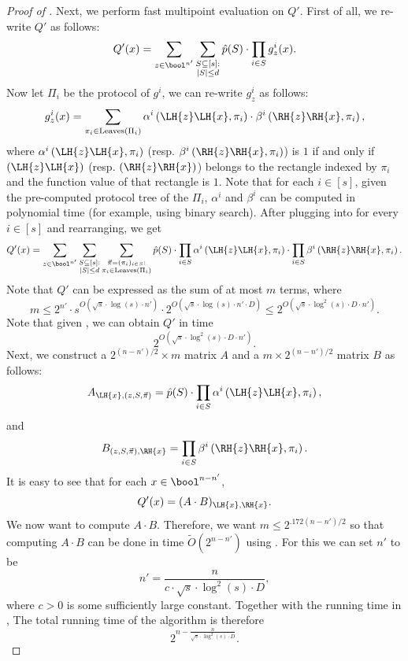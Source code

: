 \begin{proof}[Proof of ]
		Next, we perform fast multipoint evaluation on $Q'$. First of all, we re-write $Q'$ as follows:
		\begin{equation}\label{eq:sat-2}
			Q'(x) = \sum_{z\in\bool^{n'}} \sum_{\substack{S\subseteq[s]: \\ |S|\leq d}}\hat{p}(S)\cdot\prod_{i\in S}g^i_z(x).
		\end{equation}
		Now let $\Pi_i$ be the protocol of $g^i$, we can re-write $g^i_z$ as follows:
		\begin{equation}\label{eq:sat-3}
		    g^i_z(x)=\sum_{\pi_i\in\mathrm{Leaves}(\Pi_i)} \alpha^i\left(\LH{z}\LH{x},\pi_i\right)\cdot \beta^{i}\left(\RH{z}\RH{x},\pi_i\right),
		\end{equation}
		where $\alpha^i\left(\LH{z}\LH{x},\pi_i\right)$ (resp. $\beta^{i}\left(\RH{z}\RH{x},\pi_i\right)$) is $1$ if and only if $\left(\LH{z}\LH{x}\right)$ (resp. $\left(\RH{z}\RH{x}\right)$) belongs to the rectangle indexed by $\pi_i$ and the function value of that rectangle is $1$. Note that for each $i\in[s]$, given the pre-computed protocol tree of the $\Pi_i$, $\alpha^{i}$ and $\beta^{i}$ can be computed in polynomial time (for example, using binary search).
		After plugging  into  for every $i\in[s]$ and rearranging, we get
		\begin{equation}\label{eq:sat-4}
		    Q'(x) = \sum_{z\in\bool^{n'}} \sum_{\substack{S\subseteq[s]: \\ |S|\leq d}} \sum_{\substack{\vec{\pi}=(\pi_i)_{i\in S}: \\ \pi_i\in\mathrm{Leaves}(\Pi_i)}} \hat{p}(S)\cdot \prod_{i\in S} \alpha^i\left(\LH{z}\LH{x},\pi_i\right)\cdot \prod_{i\in S} \beta^{i}\left(\RH{z}\RH{x},\pi_i\right).
		\end{equation}
		Note that $Q'$ can be expressed as the sum of at most $m$ terms, where
		\[
			m\leq 2^{n'}\cdot s^{O(\sqrt{s}\cdot \log(s)\cdot n')}\cdot 2^{O(\sqrt{s}\cdot \log(s)\cdot n'\cdot D)}\leq 2^{O(\sqrt{s}\cdot\log^2(s)\cdot D\cdot n')}.
		\]
		Note that given , we can obtain $Q'$ in time
		\begin{equation}\label{eq:sat-time-1}
		    2^{O(\sqrt{s}\cdot\log^2(s)\cdot D\cdot n')}.
		\end{equation}
		Next, we construct a $2^{(n-n')/2} \times m$ matrix $A$ and a $m \times 2^{(n-n')/2}$ matrix $B$ as follows:
		\[
			A_{\LH{x},(z,S,\vec{\pi})}=\hat{p}(S)\cdot\prod_{i\in S} \alpha^i\left(\LH{z}\LH{x},\pi_i\right),
		\]
		and 
		\[
			B_{(z,S,\vec{\pi}),\RH{x}}=\prod_{i\in S} \beta^{i}\left(\RH{z}\RH{x},\pi_i\right).
		\]
		It is easy to see that for each $x\in\bool^{n-n'}$,
		\[
			Q'(x) = (A\cdot B)_{\LH{x},\RH{x}}.
		\]
		We now want to compute $A\cdot B$. Therefore, we want $m \leq 2^{.172(n-n')/2}$ so that computing $A\cdot B$ can be done in time $\tilde{O}(2^{n-n'})$ using . For this we can set $n'$ to be
		\[
			n'=\frac{n}{c\cdot\sqrt{s}\cdot \log^{2}(s)\cdot D},
		\]
		where $c>0$ is some sufficiently large constant. Together with the running time in , The total running time of the algorithm is therefore
		\[
		    2^{n-\frac{n}{\sqrt{s}\cdot\log^2(s)\cdot D}}.
		\]
		

\end{proof}
